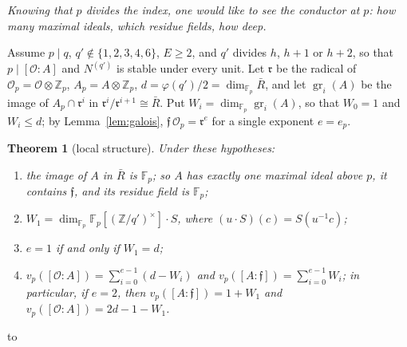 \documentclass[11pt,a4paper]{article}
\newtheorem{theorem}{Theorem}
\theoremstyle{definition}
\newcommand{\ZZ}{\mathbb{Z}}
\newcommand{\FF}{\mathbb{F}}
\newcommand{\cO}{\mathcal{O}}
\newcommand{\cf}{\mathfrak{f}}
\newcommand{\rad}{\mathfrak{r}}
\newcommand{\gr}{\operatorname{gr}}
\newcommand{\pregunta}[1]{\par\smallskip\noindent\emph{#1}\par\smallskip}
\newenvironment{keybox}
  {\par\vspace{9pt}\begin{lrbox}{\fichabox}%
   \begin{minipage}{0.90\textwidth}\vspace{7pt}\setlength{\parskip}{3pt}}
  {\vspace{7pt}\end{minipage}\end{lrbox}%
   \par\needspace{\dimexpr\ht\fichabox+\dp\fichabox+12pt\relax}\noindent\hbox to \textwidth{\hfill
   \textcolor{azul}{\rule[-\dp\fichabox]{3.2pt}{\dimexpr\ht\fichabox+\dp\fichabox\relax}}%
   \colorbox{fondoficha}{\usebox{\fichabox}}\hfill}%
   \par\vspace{9pt}}
\begin{document}
\pregunta{Knowing that $p$ divides the index, one would like to see the conductor at $p$: how many maximal
ideals, which residue fields, how deep.}

\noindent Assume $p\mid q$, $q'\notin\{1,2,3,4,6\}$, $E\ge2$, and $q'$ divides $h$, $h+1$ or $h+2$, so that $p\mid[\cO:A]$ and
$N^{(q')}$ is stable under every unit. Let $\rad$ be the radical of $\cO_p=\cO\otimes\ZZ_p$, $A_p=A\otimes\ZZ_p$,
$d=\varphi(q')/2=\dim_{\FF_p}\bar R$, and let $\gr_i(A)$ be the image of $A_p\cap\rad^i$ in
$\rad^i/\rad^{i+1}\cong\bar R$. Put $W_i=\dim_{\FF_p}\gr_i(A)$, so that $W_0=1$ and $W_i\le d$; by
Lemma~\ref{lem:galois}, $\cf\,\cO_p=\rad^{e}$ for a single exponent $e=e_p$.

\begin{keybox}
\begin{theorem}[local structure]\label{thm:loc}
Under these hypotheses:
\begin{enumerate}
\item[(a)] the image of $A$ in $\bar R$ is $\FF_p$; so $A$ has exactly one maximal ideal above $p$, it contains
 $\cf$, and its residue field is $\FF_p$;
\item[(b)] $W_1=\dim_{\FF_p}\FF_p[(\ZZ/q')^\times]\cdot S$, where $(u\cdot S)(c)=S(u^{-1}c)$;
\item[(c)] $e=1$ if and only if $W_1=d$;
\item[(d)] $v_p([\cO:A])=\sum_{i=0}^{e-1}(d-W_i)$ and $v_p([A:\cf])=\sum_{i=0}^{e-1}W_i$; in particular, if $e=2$,
 then $v_p([A:\cf])=1+W_1$ and $v_p([\cO:A])=2d-1-W_1$.
\end{enumerate}
\end{theorem}
\end{keybox}
\end{document}
